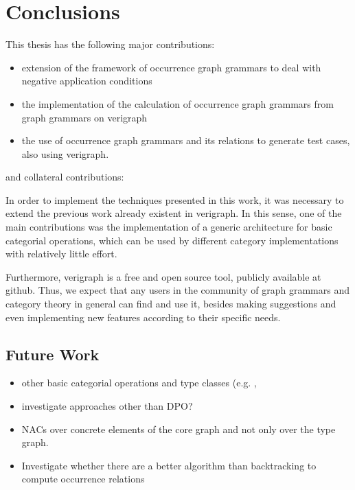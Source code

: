 \chapter{Conclusions}\label{ch:conclusions}

This thesis has the following major contributions:

\begin{itemize}
  \item extension of the framework of occurrence graph grammars to deal with negative application conditions
  \item the implementation of the calculation of occurrence graph grammars from graph grammars on verigraph
  \item the use of occurrence graph grammars and its relations to generate test cases, also using verigraph.
\end{itemize}

and collateral contributions:

  In order to implement the techniques presented in this work, it was necessary to extend the previous work already existent in verigraph. In this sense, one of the main contributions was the implementation of a generic architecture for basic categorial operations, which can be used by different category implementations with relatively little effort.

    Furthermore, verigraph is a free and open source tool, publicly available at github. Thus, we expect that any users in the community of graph grammars and category theory in general can find and use it, besides making suggestions and even implementing new features according to their specific needs.

\section{Future Work}

\begin{itemize}
  \item other basic categorial operations and type classes (e.g. , 
  \item investigate approaches other than DPO?
  \item NACs over concrete elements of the core graph and not only over the type graph. 
  \item Investigate whether there are a better algorithm than backtracking to compute occurrence relations

\end{itemize}

